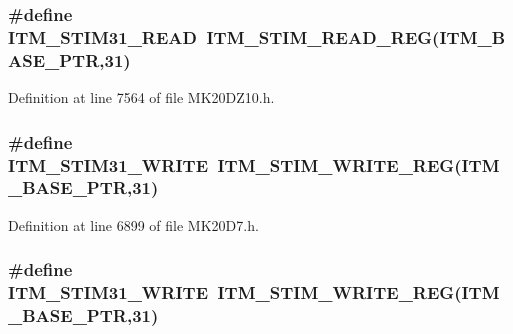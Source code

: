 \subsubsection[{\texorpdfstring{I\+T\+M\+\_\+\+S\+T\+I\+M31\+\_\+\+R\+E\+AD}{ITM_STIM31_READ}}]{\setlength{\rightskip}{0pt plus 5cm}\#define I\+T\+M\+\_\+\+S\+T\+I\+M31\+\_\+\+R\+E\+AD~{\bf I\+T\+M\+\_\+\+S\+T\+I\+M\+\_\+\+R\+E\+A\+D\+\_\+\+R\+EG}({\bf I\+T\+M\+\_\+\+B\+A\+S\+E\+\_\+\+P\+TR},31)}\hypertarget{group___i_t_m___register___accessor___macros_ga6643b5b69131aa2163f02c7d27c2305c}{}\label{group___i_t_m___register___accessor___macros_ga6643b5b69131aa2163f02c7d27c2305c}


Definition at line 7564 of file M\+K20\+D\+Z10.\+h.

\subsubsection[{\texorpdfstring{I\+T\+M\+\_\+\+S\+T\+I\+M31\+\_\+\+W\+R\+I\+TE}{ITM_STIM31_WRITE}}]{\setlength{\rightskip}{0pt plus 5cm}\#define I\+T\+M\+\_\+\+S\+T\+I\+M31\+\_\+\+W\+R\+I\+TE~{\bf I\+T\+M\+\_\+\+S\+T\+I\+M\+\_\+\+W\+R\+I\+T\+E\+\_\+\+R\+EG}({\bf I\+T\+M\+\_\+\+B\+A\+S\+E\+\_\+\+P\+TR},31)}\hypertarget{group___i_t_m___register___accessor___macros_gab792df922db5e627bc1d9917ff6b4ac2}{}\label{group___i_t_m___register___accessor___macros_gab792df922db5e627bc1d9917ff6b4ac2}


Definition at line 6899 of file M\+K20\+D7.\+h.

\subsubsection[{\texorpdfstring{I\+T\+M\+\_\+\+S\+T\+I\+M31\+\_\+\+W\+R\+I\+TE}{ITM_STIM31_WRITE}}]{\setlength{\rightskip}{0pt plus 5cm}\#define I\+T\+M\+\_\+\+S\+T\+I\+M31\+\_\+\+W\+R\+I\+TE~{\bf I\+T\+M\+\_\+\+S\+T\+I\+M\+\_\+\+W\+R\+I\+T\+E\+\_\+\+R\+EG}({\bf I\+T\+M\+\_\+\+B\+A\+S\+E\+\_\+\+P\+TR},31)}\hypertarget{group___i_t_m___register___accessor___macros_gab792df922db5e627bc1d9917ff6b4ac2}{}\label{group___i_t_m___register___accessor___macros_gab792df922db5e627bc1d9917ff6b4ac2}


